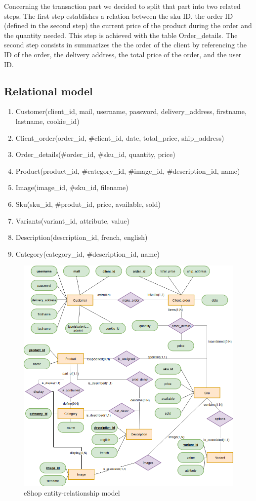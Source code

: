 \documentclass{article}
\begin{document}
Concerning the transaction part we decided to split that part into two related steps. The first step establishes a relation between the sku ID, the order ID (defined in the second step) the  current price of the product during the order and the quantity needed. This step is achieved with the table Order\_details. The second step consists in summarizes the the order of the client by referencing the ID of the order, the delivery address, the total price of the order, and  the user ID.

\subsection{Relational model}
\begin{enumerate}
\item Customer(client\_id, mail, username, password, delivery\_address, firstname, lastname, cookie\_id)
\item Client\_order(order\_id, \#client\_id, date, total\_price, ship\_address)
\item Order\_details(\#order\_id, \#sku\_id, quantity, price)
\item Product(product\_id, \#category\_id, \#image\_id, \#description\_id, name)
\item Image(image\_id, \#sku\_id, filename)
\item Sku(sku\_id, \#produt\_id, price, available, sold)
\item Variants(variant\_id, attribute, value)
\item Description(description\_id,  french,  english)
\item Category(category\_id, \#description\_id, name)
\end{enumerate}

\begin{figure}[h!]
    \centering
    \includegraphics[scale=0.4]{./images/ecommerce_ER.png}
    \caption{eShop entity-relationship model}
    \label{ecommerce_er}
\end{figure}
\end{document}

